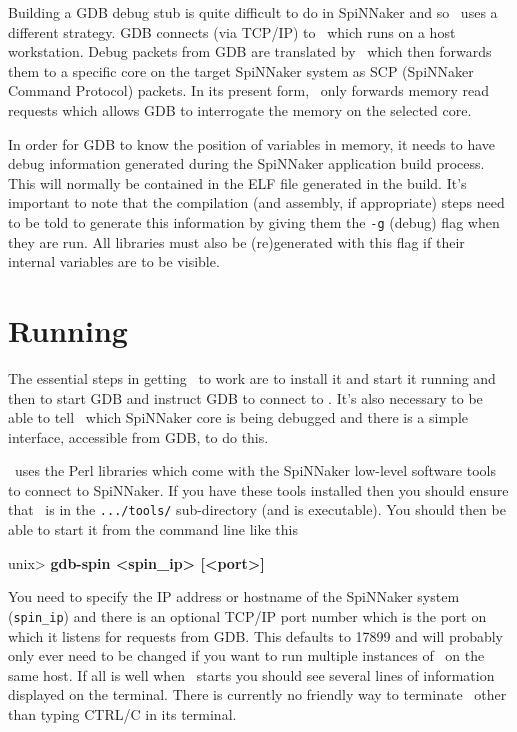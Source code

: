 Building a GDB debug stub is quite difficult to do in SpiNNaker and
so \gdbspin\ uses a different strategy. GDB connects (via TCP/IP)
to \gdbspin\ which runs on a host workstation. Debug packets from GDB
are translated by \gdbspin\ which then forwards them to a specific
core on the target SpiNNaker system as SCP (SpiNNaker Command
Protocol) packets. In its present form, \gdbspin\ only forwards memory
read requests which allows GDB to interrogate the memory on the
selected core.

In order for GDB to know the position of variables in memory, it needs
to have debug information generated during the SpiNNaker application
build process. This will normally be contained in the ELF file
generated in the build. It's important to note that the compilation
(and assembly, if appropriate) steps need to be told to generate this
information by giving them the \texttt{-g} (debug) flag when they are
run. All libraries must also be (re)generated with this flag if their
internal variables are to be visible.

\section{Running \gdbspin}

The essential steps in getting \gdbspin\ to work are to install it and
start it running and then to start GDB and instruct GDB to connect
to \gdbspin. It's also necessary to be able to tell \gdbspin\ which
SpiNNaker core is being debugged and there is a simple interface,
accessible from GDB, to do this.

\gdbspin\ uses the Perl libraries which come with the SpiNNaker
low-level software tools to connect to SpiNNaker. If you have these
tools installed then you should ensure that \gdbspin\ is in
the \texttt{.../tools/} sub-directory (and is executable). You should
then be able to start it from the command line like this

\begin{shell}
unix> \textbf{gdb-spin <spin\_ip> [<port>]}
\end{shell}

You need to specify the IP address or hostname of the SpiNNaker system
(\texttt{spin\_ip}) and there is an optional TCP/IP port number which
is the port on which it listens for requests from GDB. This defaults
to 17899 and will probably only ever need to be changed if you want to
run multiple instances of \gdbspin\ on the same host. If all is well
when \gdbspin\ starts you should see several lines of information
displayed on the terminal. There is currently no friendly way to
terminate \gdbspin\ other than typing CTRL/C in its terminal.

